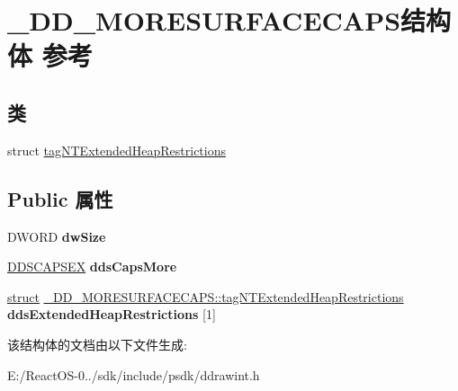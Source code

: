 \hypertarget{struct___d_d___m_o_r_e_s_u_r_f_a_c_e_c_a_p_s}{}\section{\+\_\+\+D\+D\+\_\+\+M\+O\+R\+E\+S\+U\+R\+F\+A\+C\+E\+C\+A\+P\+S结构体 参考}
\label{struct___d_d___m_o_r_e_s_u_r_f_a_c_e_c_a_p_s}
\subsection*{类}
\begin{DoxyCompactItemize}
\item 
struct \hyperlink{struct___d_d___m_o_r_e_s_u_r_f_a_c_e_c_a_p_s_1_1tag_n_t_extended_heap_restrictions}{tag\+N\+T\+Extended\+Heap\+Restrictions}
\end{DoxyCompactItemize}
\subsection*{Public 属性}
\begin{DoxyCompactItemize}
\item 
\mbox{\label{struct___d_d___m_o_r_e_s_u_r_f_a_c_e_c_a_p_s_a0de0858f1a8e4aa60b7513a928d9f761}} 
D\+W\+O\+RD {\bfseries dw\+Size}
\item 
\mbox{\label{struct___d_d___m_o_r_e_s_u_r_f_a_c_e_c_a_p_s_a04a7989620a2630a2c582acb1571da99}} 
\hyperlink{struct___d_d_s_c_a_p_s_e_x}{D\+D\+S\+C\+A\+P\+S\+EX} {\bfseries dds\+Caps\+More}
\item 
\mbox{\label{struct___d_d___m_o_r_e_s_u_r_f_a_c_e_c_a_p_s_ad49ffd7e1dec99eb89290e6416552a8b}} 
\hyperlink{interfacestruct}{struct} \hyperlink{struct___d_d___m_o_r_e_s_u_r_f_a_c_e_c_a_p_s_1_1tag_n_t_extended_heap_restrictions}{\+\_\+\+D\+D\+\_\+\+M\+O\+R\+E\+S\+U\+R\+F\+A\+C\+E\+C\+A\+P\+S\+::tag\+N\+T\+Extended\+Heap\+Restrictions} {\bfseries dds\+Extended\+Heap\+Restrictions} \mbox{[}1\mbox{]}
\end{DoxyCompactItemize}


该结构体的文档由以下文件生成\+:\begin{DoxyCompactItemize}
\item 
E\+:/\+React\+O\+S-\/0../sdk/include/psdk/ddrawint.\+h\end{DoxyCompactItemize}
